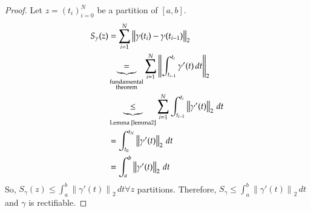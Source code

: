 \documentclass{article}
\newcommand{\norm}[1]{\left\|#1\right\|}
\begin{document}
\begin{proof}
  Let $z = (t_i)_{i=0}^N$ be a partition of $[a,b]$.
  \begin{align*}
    S_\gamma(z)
      &= \sum_{i=1}^N \norm{\gamma(t_i) - \gamma(t_{i-1})}_2 \\
      &\underbrace{=}_{\substack{\text{fundamental} \\ \text{theorem}}} \sum_{i=1}^N \norm{\int_{t_{i-1}}^{t_i} \gamma'(t) \, dt}_2 \\
      &\underbrace{\leq}_{\text{Lemma~\ref{lemma2}}} \sum_{i=1}^N \int_{t_{i-1}}^{t_i} \norm{\gamma'(t)}_2 \, dt \\
      &= \int_{t_0}^{t_N} \norm{\gamma'(t)}_2 \, dt \\
      &= \int_a^b \norm{\gamma'(t)}_2 \, dt
  \end{align*}
  So, $S_{\gamma}(z) \leq \int_a^b \norm{\gamma'(t)}_2 \, dt \forall z$ partitions.
  Therefore, $S_{\gamma} \leq \int_a^b \norm{\gamma'(t)}_2 \, dt$ and $\gamma$ is rectifiable.


\end{proof}
\end{document}
